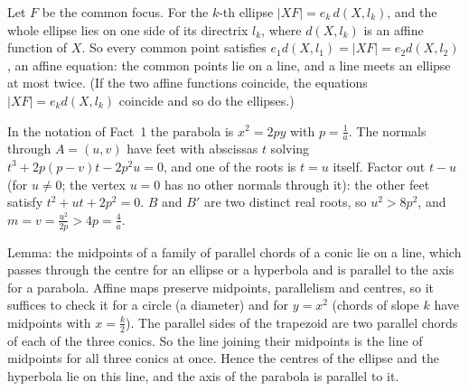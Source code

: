 \documentclass[11pt,a4paper]{article}
\begin{document}
 Let $F$ be the common focus. For the $k$-th ellipse $|XF|=e_k\,d(X,l_k)$, and the whole ellipse lies on one side of its directrix $l_k$, where $d(X,l_k)$ is an affine function of $X$.
 So every common point satisfies $e_1d(X,l_1)=|XF|=e_2d(X,l_2)$, an affine equation: the common points lie on a line, and a line meets an ellipse at most twice. (If the two affine functions coincide, the equations $|XF|=e_kd(X,l_k)$ coincide and so do the ellipses.)

 In the notation of Fact~1 the parabola is $x^2=2py$ with $p=\frac1a$. The normals through $A=(u,v)$ have feet with abscissas $t$ solving $t^3+2p(p-v)t-2p^2u=0$, and one of the roots is $t=u$ itself.
 Factor out $t-u$ (for $u\ne0$; the vertex $u=0$ has no other normals through it): the other feet satisfy $t^2+ut+2p^2=0$.
 $B$ and $B'$ are two distinct real roots, so $u^2>8p^2$, and $m=v=\frac{u^2}{2p}>4p=\frac4a$.

 Lemma: the midpoints of a family of parallel chords of a conic lie on a line, which passes through the centre for an ellipse or a hyperbola and is parallel to the axis for a parabola. Affine maps preserve midpoints, parallelism and centres, so it suffices to check it for a circle (a diameter) and for $y=x^2$ (chords of slope $k$ have midpoints with $x=\frac k2$).
 The parallel sides of the trapezoid are two parallel chords of each of the three conics. So the line joining their midpoints is the line of midpoints for all three conics at once.
 Hence the centres of the ellipse and the hyperbola lie on this line, and the axis of the parabola is parallel to it.
\end{document}
